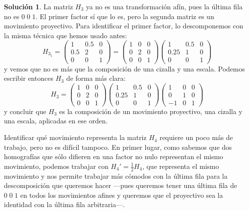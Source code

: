 \documentclass[a4paper, 11pt]{article}
\theoremstyle{definition}
\newtheorem*{solucion}{Solución}
\theoremstyle{theorem}
\begin{document}
\begin{solucion}
      La matriz $H_3$ ya no es una transformación afín, pues la última fila no es $0\;0\;1$. El primer factor sí que lo es, pero la segunda matriz es un movimiento proyectivo. Para identificar el primer factor, lo descomponemos con la misma técnica que hemos usado antes:
      \[
          H_{3_1} = \left(
          \begin{array}{ccc}
              1 & 0.5 & 0 \\
              0.5 & 2 & 0 \\
              0 & 0 & 1
          \end{array}
          \right) =
          \left(
          \begin{array}{ccc}
              1 & 0 & 0 \\
              0 & 2 & 0 \\
              0 & 0 & 1
          \end{array}
          \right)
          \left(
          \begin{array}{ccc}
              1 & 0.5 & 0 \\
              0.25 & 1 & 0 \\
              0 & 0 & 1
          \end{array}
          \right)
      \]
      y vemos que no es más que la composición de una cizalla y una escala. Podemos escribir entonces $H_3$ de forma más clara:
      \[
          H_3 =
          \left(
          \begin{array}{ccc}
              1 & 0 & 0 \\
              0 & 2 & 0 \\
              0 & 0 & 1
          \end{array}
          \right)
          \left(
          \begin{array}{ccc}
              1 & 0.5 & 0 \\
              0.25 & 1 & 0 \\
              0 & 0 & 1
          \end{array}
          \right)
          \left(
          \begin{array}{ccc}
              1 & 0 & 0 \\
              0 & 1 & 0 \\
              -1 & 0 & 1
          \end{array}
          \right)
      \]
      y concluir que  $H_3$ es la composición de un movimiento proyectivo, una cizalla y una escala, aplicadas en ese orden.

      Identificar qué movimiento representa la matriz $H_4$ requiere un poco más de trabajo, pero no es difícil tampoco. En primer lugar, como sabemos que dos homografías que sólo difieren en una factor no nulo representan el mismo movimiento, podemos trabajar con $H_4' = \frac{1}{2}H_4$, que representa el mismo movimiento y nos permite trabajar más cómodos con la última fila para la descomposición que queremos hacer ---pues queremos tener una última fila de $0\;0\;1$ en todos los movimientos afines y queremos que el proyectivo sea la identidad con la última fila arbitraria---.


\end{solucion}
\end{document}
